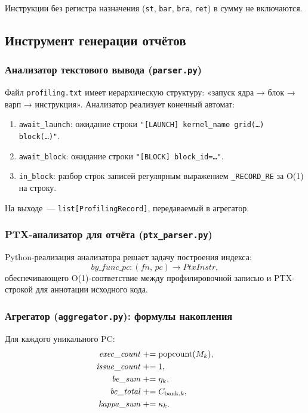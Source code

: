 Инструкции без регистра назначения (\texttt{st}, \texttt{bar},
\texttt{bra}, \texttt{ret}) в сумму не включаются.

\subsection{Инструмент генерации отчётов}

\subsubsection{Анализатор текстового вывода (\texttt{parser.py})}

Файл \texttt{profiling.txt} имеет иерархическую структуру:
«запуск ядра → блок → варп → инструкция». Анализатор реализует конечный
автомат:

\begin{enumerate}
  \item \texttt{await\_launch}: ожидание строки
        \texttt{"[LAUNCH] kernel\_name grid(…) block(…)"}.
  \item \texttt{await\_block}: ожидание строки
        \texttt{"[BLOCK] block\_id=…"}.
  \item \texttt{in\_block}: разбор строк записей регулярным
        выражением \texttt{\_RECORD\_RE} за O(1) на строку.
\end{enumerate}

На выходе~--- \texttt{list[ProfilingRecord]}, передаваемый в агрегатор.

\subsubsection{PTX-анализатор для отчёта (\texttt{ptx\_parser.py})}

Python-реализация анализатора решает задачу построения индекса:
\begin{equation}
  \mathit{by\_func\_pc} : (\mathit{fn},\, \mathit{pc})
  \to \mathit{PtxInstr},
\end{equation}
обеспечивающего O(1)-соответствие между профилировочной записью
и PTX-строкой для аннотации исходного кода.

\subsubsection{Агрегатор (\texttt{aggregator.py}): формулы накопления}

Для каждого уникального PC:
\begin{align}
  \mathit{exec\_count} &\mathrel{+}= \mathrm{popcount}(M_k), \\
  \mathit{issue\_count} &\mathrel{+}= 1, \\
  \mathit{be\_sum} &\mathrel{+}= \eta_k, \\
  \mathit{bc\_total} &\mathrel{+}= C_{\mathrm{bank},k}, \\
  \mathit{kappa\_sum} &\mathrel{+}= \kappa_k.
\end{align}

